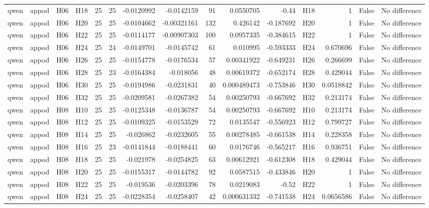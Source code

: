 \begin{longtable}{llllrrrrrrrlrrl}
qwen & appod & H06 & H18 & 25 & 25 & -0.0120992 & -0.0142159 & 91 & 0.0550705 & -0.44 & H18 & 1 & False & No difference \\
qwen & appod & H06 & H20 & 25 & 25 & -0.0104662 & -0.00321161 & 132 & 0.426142 & -0.187692 & H20 & 1 & False & No difference \\
qwen & appod & H06 & H22 & 25 & 25 & -0.0114177 & -0.00907303 & 100 & 0.0957335 & -0.384615 & H22 & 1 & False & No difference \\
qwen & appod & H06 & H24 & 25 & 24 & -0.0149701 & -0.0145742 & 61 & 0.010995 & -0.593333 & H24 & 0.670696 & False & No difference \\
qwen & appod & H06 & H26 & 25 & 25 & -0.0154778 & -0.0176534 & 57 & 0.00341922 & -0.649231 & H26 & 0.266699 & False & No difference \\
qwen & appod & H06 & H28 & 25 & 23 & -0.0164384 & -0.018056 & 48 & 0.00619372 & -0.652174 & H28 & 0.429044 & False & No difference \\
qwen & appod & H06 & H30 & 25 & 25 & -0.0194986 & -0.0231831 & 40 & 0.000489473 & -0.753846 & H30 & 0.0518842 & False & No difference \\
qwen & appod & H06 & H32 & 25 & 25 & -0.0209581 & -0.0267382 & 54 & 0.00250793 & -0.667692 & H32 & 0.213174 & False & No difference \\
qwen & appod & H08 & H10 & 25 & 25 & -0.0125348 & -0.0136787 & 54 & 0.00250793 & -0.667692 & H10 & 0.213174 & False & No difference \\
qwen & appod & H08 & H12 & 25 & 25 & -0.0109325 & -0.0153529 & 72 & 0.0135547 & -0.556923 & H12 & 0.799727 & False & No difference \\
qwen & appod & H08 & H14 & 25 & 25 & -0.026862 & -0.0232605 & 55 & 0.00278485 & -0.661538 & H14 & 0.228358 & False & No difference \\
qwen & appod & H08 & H16 & 25 & 23 & -0.0141844 & -0.0188441 & 60 & 0.0176746 & -0.565217 & H16 & 0.936751 & False & No difference \\
qwen & appod & H08 & H18 & 25 & 25 & -0.021978 & -0.0254825 & 63 & 0.00612921 & -0.612308 & H18 & 0.429044 & False & No difference \\
qwen & appod & H08 & H20 & 25 & 25 & -0.0155317 & -0.0144782 & 92 & 0.0587515 & -0.433846 & H20 & 1 & False & No difference \\
qwen & appod & H08 & H22 & 25 & 25 & -0.019536 & -0.0203396 & 78 & 0.0219083 & -0.52 & H22 & 1 & False & No difference \\
qwen & appod & H08 & H24 & 25 & 25 & -0.0228354 & -0.0258407 & 42 & 0.000631332 & -0.741538 & H24 & 0.0656586 & False & No difference \\

\end{longtable}
